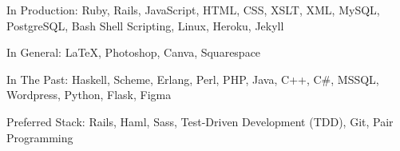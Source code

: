 \begin{cvskills}
	\cvskill
  {In Production:}
  { Ruby, Rails, JavaScript, HTML, CSS, XSLT, XML, MySQL, Post\nopagebreak[4]greSQL, Bash Shell Scripting, Linux, Heroku, Jekyll}

  \cvskill
  {In General:}
  {\LaTeX, Photoshop, Canva, Squarespace}

  \cvskill
  {In The Past:}
  {Haskell, Scheme, Erlang, Perl, PHP, Java, C++, C\#, MSSQL, Wordpress, Python, Flask, Figma}

  \cvskill
  {Preferred Stack:}
  {Rails, Haml, Sass, Test-Driven Development (TDD), Git, Pair Programming}
\end{cvskills}
